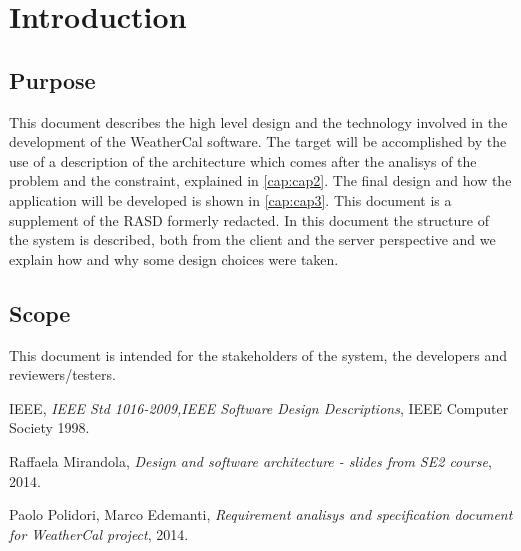\chapter{Introduction} \label{cap:cap1}

\section{Purpose}
This document describes the high level design and the technology involved in the development of the WeatherCal software. The target will be accomplished by the use of a description of the architecture which comes after the analisys of the problem and the constraint, explained in \autoref{cap:cap2}. The final design and how the application will be developed is shown in \autoref{cap:cap3}. This document is a supplement of the RASD formerly redacted.
In this document the structure of the system is described, both from the client and the server perspective and we explain how and why some design choices were taken.

\section{Scope}
This document is intended for the stakeholders of the system, the developers and reviewers/testers.


\begin{thebibliography}{9}
IEEE,
\textit{IEEE Std 1016-2009,IEEE Software Design Descriptions},
IEEE Computer Society 1998.
 
Raffaela Mirandola,
\textit{Design and software architecture - slides from SE2 course},
2014.
 
Paolo Polidori, Marco Edemanti,
\textit{Requirement analisys and specification document for WeatherCal project},
2014.

\end{thebibliography}